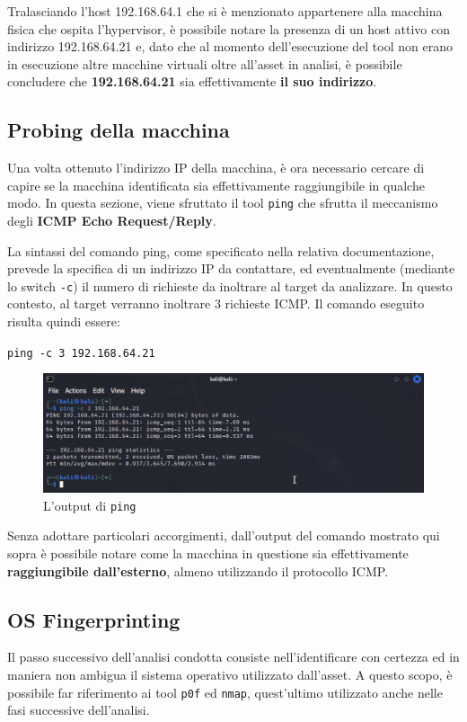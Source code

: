 \documentclass[a4paper, 12pt, oneside]{article}
\begin{document}
Tralasciando l'host 192.168.64.1 che si è menzionato appartenere alla macchina fisica che ospita l'hypervisor, è possibile notare la presenza di un host attivo con indirizzo 192.168.64.21 e, dato che al momento dell'esecuzione del tool non erano in esecuzione altre macchine virtuali oltre all'asset in analisi, è possibile concludere che \textbf{192.168.64.21} sia effettivamente \textbf{il suo indirizzo}.

\subsection{Probing della macchina}

Una volta ottenuto l'indirizzo IP della macchina, è ora necessario cercare di capire se la macchina identificata sia effettivamente raggiungibile in qualche modo. In questa sezione, viene sfruttato il tool \texttt{ping} che sfrutta il meccanismo degli \textbf{ICMP Echo Request\slash Reply}.

La sintassi del comando ping, come specificato nella relativa documentazione, prevede la specifica di un indirizzo IP da contattare, ed eventualmente (mediante lo switch \texttt{-c}) il numero di richieste da inoltrare al target da analizzare. In questo contesto, al target verranno inoltrare 3 richieste ICMP. Il comando eseguito risulta quindi essere:

\begin{center}
    \texttt{ping -c 3 192.168.64.21}
\end{center}

\begin{figure}[h!]
    \centering
    \includegraphics[width=\textwidth]{img/ping.png}
    \caption{L'output di \texttt{ping}}
\end{figure}

Senza adottare particolari accorgimenti, dall'output del comando mostrato qui sopra è possibile notare come la macchina in questione sia effettivamente \textbf{raggiungibile dall'esterno}, almeno utilizzando il protocollo ICMP.

\subsection{OS Fingerprinting}
Il passo successivo dell'analisi condotta consiste nell'identificare con certezza ed in maniera non ambigua il sistema operativo utilizzato dall'asset. A questo scopo, è possibile far riferimento ai tool \texttt{p0f} ed \texttt{nmap}, quest'ultimo utilizzato anche nelle fasi successive dell'analisi.
\end{document}
